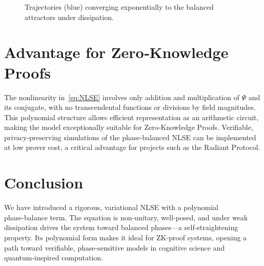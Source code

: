 \documentclass[11pt]{article}
\begin{document}
\begin{figure}[htbp]
\centering
{}
\caption{Trajectories (blue) converging exponentially to the balanced attractors under dissipation.}
\label{fig:self}
\end{figure}

\section{Advantage for Zero‑Knowledge Proofs}
The nonlinearity in~\eqref{eq:NLSE} involves only addition and multiplication of \(\Psi\) and its conjugate, with no transcendental functions or divisions by field magnitudes. This polynomial structure allows efficient representation as an arithmetic circuit, making the model exceptionally suitable for Zero‑Knowledge Proofs. Verifiable, privacy‑preserving simulations of the phase‑balanced NLSE can be implemented at low prover cost, a critical advantage for projects such as the Radiant Protocol.

\section{Conclusion}
We have introduced a rigorous, variational NLSE with a polynomial phase‑balance term. The equation is non‑unitary, well‑posed, and under weak dissipation drives the system toward balanced phases—a self‑straightening property. Its polynomial form makes it ideal for ZK‑proof systems, opening a path toward verifiable, phase‑sensitive models in cognitive science and quantum‑inspired computation.
\end{document}
